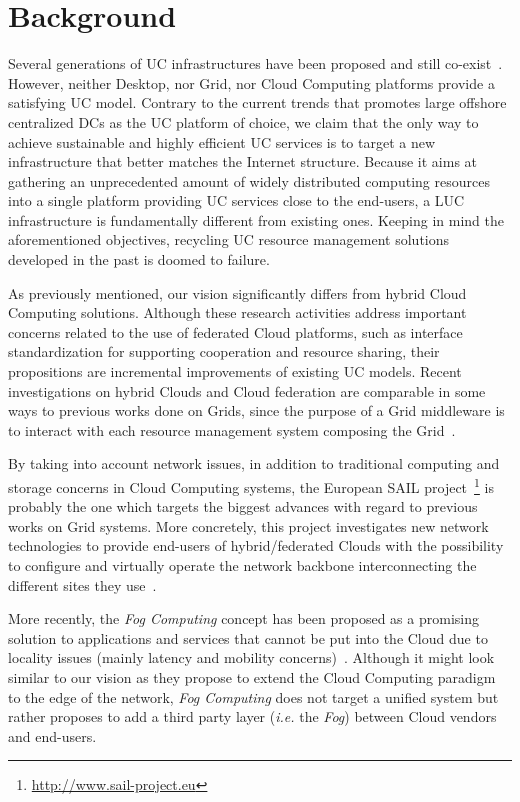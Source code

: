 \section{Background\label{sec:background}}

Several generations of UC infrastructures have been proposed and still
co-exist~\cite{foster:2011}. However, neither Desktop, nor Grid, nor Cloud Computing
platforms provide a satisfying UC model. Contrary to the current trends that promotes large
offshore centralized DCs as the UC platform of choice, we claim that the only way to
achieve sustainable and highly efficient UC services is to target a new infrastructure
that better matches the Internet structure. Because it aims at gathering an unprecedented
amount of widely distributed computing resources into a single platform providing UC
services close to the end-users, a LUC infrastructure is fundamentally different from
existing ones. Keeping in mind the aforementioned objectives, recycling UC resource
management solutions developed in the past is doomed to failure.

As previously mentioned, our vision significantly differs from hybrid Cloud Computing
solutions.  Although these research activities address important concerns related to the
use of federated Cloud platforms, such as interface standardization for supporting
cooperation and resource sharing, their propositions are incremental improvements of
existing UC models. Recent investigations on hybrid Clouds and Cloud federation are
comparable in some ways to previous works done on Grids, since the purpose of a Grid
middleware is to interact with each resource management system composing the
Grid~\cite{buyya:2010,rochwerger:2009,zhao:2012}.

By taking into account network issues, in addition to traditional computing and storage
concerns in Cloud Computing systems, the European SAIL
project~\footnote{\href{http://www.sail-project.eu}{\url{http://www.sail-project.eu}}} is
probably the one which targets the biggest advances with regard to previous works on Grid
systems. More concretely, this project investigates new network technologies to provide
end-users of hybrid/federated Clouds with the possibility to configure and virtually
operate the network backbone interconnecting the different sites they
use~\cite{sail:2012}.

More recently, the \emph{Fog Computing} concept has been proposed as a promising solution
to applications and services that cannot be put into the Cloud due to locality issues
(mainly latency and mobility concerns)~\cite{bonomi:2012}. Although it might look similar
to our vision as they propose to extend the Cloud Computing paradigm to the edge of the
network, \emph{Fog Computing} does not target a unified system but rather proposes to add
a third party layer (\textit{i.e.} the \emph{Fog}) between Cloud vendors and end-users.

